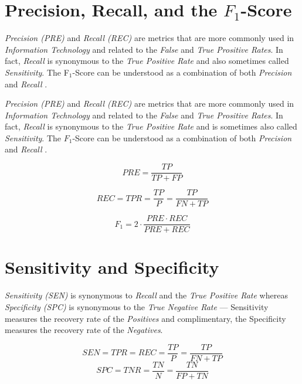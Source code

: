 \documentclass{article}
\begin{document}
\section{Precision, Recall, and the $F_1$-Score}


\emph{Precision (PRE)} and \emph{Recall (REC)} are metrics that are more commonly used in \emph{Information Technology} and related to the \emph {False} and \emph{True Prositive Rates}. In fact, \emph{Recall} is synonymous to the \emph{True Positive Rate} and also sometimes called \emph{Sensitivity}. The F$_1$-Score can be understood as a combination of both \emph{Precision} and \emph{Recall} \cite{goutte2005probabilistic}.

\emph{Precision (PRE)} and \emph{Recall (REC)} are metrics that are more commonly used in \emph{Information Technology} and related to the \emph {False} and \emph{True Prositive Rates}. In fact, \emph{Recall} is synonymous to the \emph{True Positive Rate} and is sometimes also called \emph{Sensitivity}. The $F_1$-Score can be understood as a combination of both \emph{Precision} and \emph{Recall} \cite{goutte2005probabilistic}.


\begin{equation} PRE = \frac{TP}{TP + FP} \end{equation}

\begin{equation} REC = TPR = \frac{TP}{P} =  \frac{TP}{FN + TP} \end{equation}

\begin{equation} F_1 = 2 \cdot \frac{PRE \cdot REC}{PRE + REC}\end{equation}





\section{Sensitivity and Specificity}

\emph{Sensitivity (SEN)} is synonymous to \emph{Recall} and the \emph{True Positive Rate} whereas \emph{Specificity (SPC)} is synonymous to the \emph{True Negative Rate} --- Sensitivity measures the recovery rate of the \emph{Positives} and complimentary, the Specificity  measures the recovery rate of the \emph{Negatives}.

\begin{equation} SEN = TPR = REC = \frac{TP}{P} =  \frac{TP}{FN + TP} \end{equation}
\begin{equation} SPC = TNR =\frac{TN}{N} =  \frac{TN}{FP + TN} \end{equation}
\end{document}
